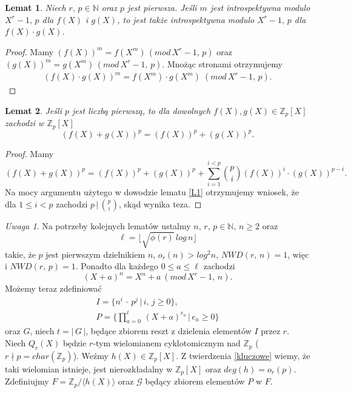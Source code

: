 \documentclass[polish,declaration,shortabstract]{iithesis}
\theoremstyle{definition}
\theoremstyle{remark} \newtheorem{observation}{Obserwacja}
\theoremstyle{plain} \newtheorem{theorem}{Twierdzenie}
\theoremstyle{plain} \newtheorem{lemma}{Lemat}
\theoremstyle{remark} \newtheorem*{remark*}{Uwaga}
\theoremstyle{reminder} \newtheorem*{reminder*}{Przypomnienie}
\begin{document}
\begin{lemma}\label{intro2}
	Niech $r, \, p \in \mathbb{N}$ oraz $p$ jest pierwsza. Jeśli $m$ jest introspektywna modulo $X^r - 1, \, p$ dla $f(X)$ i $g(X)$, to jest także introspektywna modulo $X^r - 1, \, p$ dla ${f(X) \cdot g(X)}$.
\end{lemma}
	
\begin{proof}
	Mamy $(f(X))^m = f(X^m) \, (mod \, X^r - 1, \, p)$ oraz $(g(X))^m = g(X^m) \, (mod \, X^r - 1, \, p)$. Mnożąc stronami otrzymujemy 
	\begin{align*}
		(f(X) \cdot g(X))^m = f(X^m) \cdot g(X^m) \; (mod \, X^r - 1, \, p). 
	\end{align*}
\end{proof}

\begin{lemma}\label{p_intro}
	Jeśli $p$ jest liczbą pierwszą, to dla dowolnych $f(X), g(X) \in \mathbb{Z}_p[X]$ zachodzi w $\mathbb{Z}_p[X]$ \[(f(X) + g(X))^p = (f(X))^p + (g(X))^p.\]
\end{lemma}
	
\begin{proof}
	Mamy \[(f(X) + g(X))^p = (f(X))^p + (g(X))^p + \sum_{i=1}^{i < p}{p \choose i}(f(X))^i\cdot(g(X))^{p - i}.\] Na mocy argumentu użytego w dowodzie lematu \ref{L1} otrzymujemy wniosek, że dla $1 \leq i < p$ zachodzi $p \, | \, {p \choose i}$, skąd wynika teza.
\end{proof}

\begin{remark*}\label{def}
	Na potrzeby kolejnych lematów ustalmy $n, \, r, \, p \in \mathbb{N}, \, n \geq 2 
	$ oraz \[\ell = \lfloor\sqrt{\phi (r)} \, log \, n \rfloor\] takie, że $p$ jest pierwszym dzielnikiem $n$, $o_r(n) > log^2n$, $NWD(r, \, n) = 1$, więc i $NWD(r, \, p) = 1$. Ponadto dla każdego $0 \leq a \leq \ell$ zachodzi \[(X + a)^n = X^n + a \: (mod \, X^r - 1, \, n).\] Możemy teraz zdefiniować 
	\begin{align*}
		I = \{n^i \, \cdot \, p^j \, | \, i, \, j \geq 0\},            \\
		P = \{\prod_{a=0}^{\ell} \, (X + a)^{e_a} \, | \, e_a \geq 0\} 
	\end{align*}
	oraz $G$, niech $t = | \, G \, |$, będące zbiorem reszt z dzielenia elementów $I$ przez $r$. Niech $Q_r(X)$ będzie $r$-tym wielomianem cyklotomicznym nad $\mathbb{Z}_p$ ($ r \nmid p = char(\mathbb{Z}_p)$). Weźmy $h(X) \in \mathbb{Z}_p[X]$. Z twierdzenia \ref{kluczowe} wiemy, że taki wielomian istnieje, jest nierozkładalny w $\mathbb{Z}_p[X]$ oraz $deg(h) = o_r(p)$. Zdefiniujmy $F = \mathbb{Z}_p / \langle h(X) \rangle$ oraz $\mathcal{G}$ będący zbiorem elementów $P$ w $F$.
\end{remark*}
\end{document}
